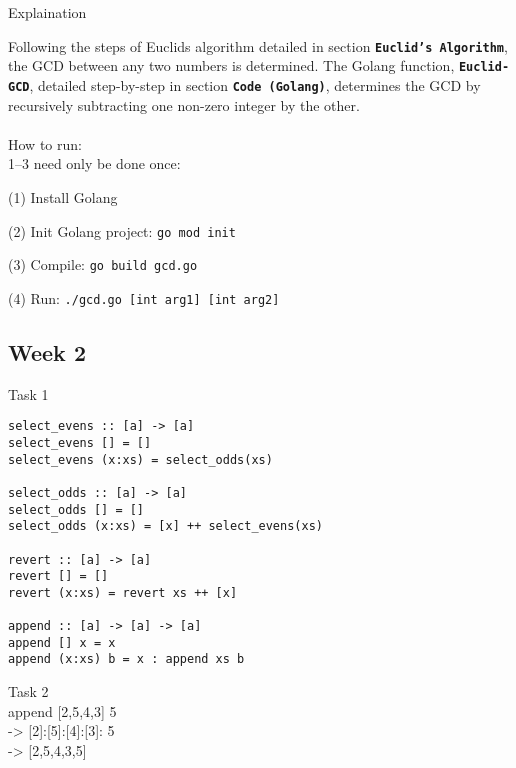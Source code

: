 \documentclass{article}
\theoremstyle{theorem}
\theoremstyle{definition}
\theoremstyle{remark}
\begin{document}
{\large Explaination\\}

Following the steps of Euclids algorithm detailed in section \texttt{{\bf Euclid's Algorithm}}, the GCD between any two numbers is determined. The Golang function, \texttt{{\bf Euclid-GCD}}, detailed step-by-step in section \texttt{{\bf Code (Golang)}}, determines the GCD by recursively subtracting one non-zero integer by the other.\\\\

{\large How to run:\\}
1--3 need only be done once:

(1) Install Golang

(2) Init Golang project: \texttt{go mod init} 

(3) Compile: \texttt{go build gcd.go} 

(4) Run: \texttt{./gcd.go [int arg1] [int arg2]} 

\subsection{Week 2}
{\large Task 1\\}
\begin{lstlisting}
select_evens :: [a] -> [a]
select_evens [] = []
select_evens (x:xs) = select_odds(xs)

select_odds :: [a] -> [a]
select_odds [] = []
select_odds (x:xs) = [x] ++ select_evens(xs)

revert :: [a] -> [a]  
revert [] = []  
revert (x:xs) = revert xs ++ [x]  

append :: [a] -> [a] -> [a]
append [] x = x
append (x:xs) b = x : append xs b
\end{lstlisting}

{\large Task 2\\}
append [2,5,4,3] 5 \\
-{\textgreater} [2]:[5]:[4]:[3]: 5 \\
-{\textgreater} [2,5,4,3,5]
\end{document}

